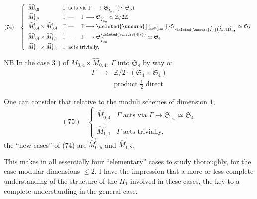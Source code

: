 \[
(74)\quad\left\{\begin{array}{ll}
\widehat M^!_{0,5}&\Gamma\text{ acts via }\Gamma\longrightarrow\mathfrak S_{\widehat I_{\alpha_0}}\ (\simeq\mathfrak S_5)\\
\widehat M^!_{1,2}&\Gamma\text{ --- }\quad\Gamma\longrightarrow\mathfrak S_{\widehat I_{\alpha_0}}\simeq\mathbb Z/2\mathbb Z\\
\widehat M^!_{0,4}\times\widehat M^!_{0,4}&\Gamma\text{ --- }\quad\Gamma\longrightarrow\deleted{\unsure{\prod_{\alpha\in\{\alpha_0,}}}\mathfrak S_{\deleted{\unsure{\widehat I}}\bigl(\widehat I_{\alpha_0}\amalg\widehat I_{\alpha_1}}\simeq\mathfrak S_8\\
\widehat M^!_{0,4}\times\widehat M^!_{1,1}&\Gamma\text{ --- }\quad\Gamma\longrightarrow\mathfrak S^{\deleted{\unsure{4|*}}}_{\widehat I_{\alpha_0}}\simeq\mathfrak S_4\\
\widehat M^!_{1,1}\times\widehat M^!_{1,1}&\Gamma\text{ acts trivially.}
\end{array}\right.
\]

\uline{NB}  In the case $3^\circ$) of $\widehat M_{0,4}\times\widehat M_{0,4}$, $\Gamma$  into $\mathfrak S_8$ by way of
\[
\begin{array}{rcl}
\Gamma&\longrightarrow&\mathbb Z/2\mathbin{\cdot}(\mathfrak S_4\times\mathfrak S_4)\\
&&\text{product }\frac12\text{ direct}
\end{array}
\]

One can consider that relative to the moduli schemes  of dimension $1$, 
\[
(75)\quad\left\{\begin{array}{ll}
\widehat M^!_{0,4}&\Gamma\text{ acts via }\Gamma\longrightarrow\mathfrak S_{I_{\alpha_0}}\simeq\mathfrak S_4\\
\widehat M^!_{1,1}&\Gamma\text{ acts trivially},
\end{array}\right.
\]
the ``new cases'' of (74) are $\widehat M^!_{0,5}$ and $\widehat M^!_{1,2}$.

This makes in all essentially four ``elementary'' cases to study thoroughly, for the case  modular dimensions $\leq2$. I have the impression that a more or less complete understanding of the structure of the  $\Pi_1$ involved in these cases,  the key to a complete understanding in the general case.
